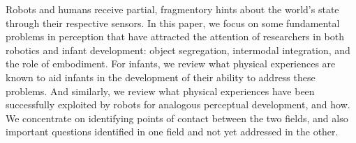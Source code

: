 
Robots and humans receive partial, fragmentory hints about the world's
state through their respective sensors.  In this paper, we focus on
some fundamental problems in perception that have attracted the
attention of researchers in both robotics and infant development:
object segregation, intermodal integration, and the role of
embodiment.  For infants, we review what physical experiences are
known to aid infants in the development of their ability to address
these problems.  And similarly, we review what physical experiences
have been successfully exploited by robots for analogous perceptual
development, and how.  We concentrate on identifying points of contact
between the two fields, and also important questions identified in one
field and not yet addressed in the other.




